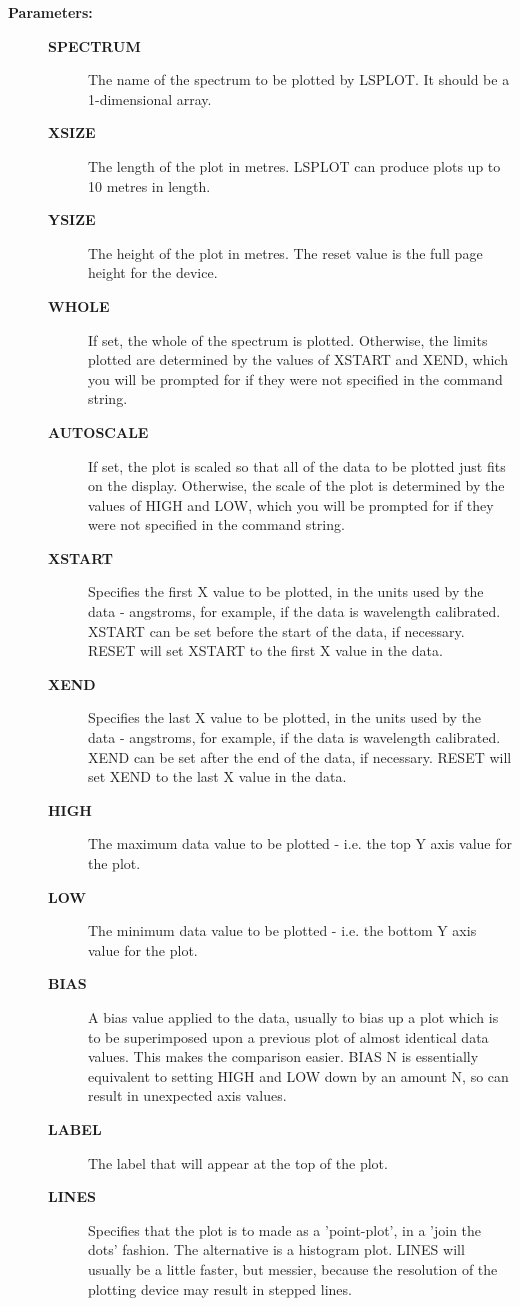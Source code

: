 \begin{description}
\begin{description}
\item [\textbf{Parameters:}]
\begin{description}
\item [\textbf{SPECTRUM}]
 The name of the spectrum to be plotted by LSPLOT.
 It should be a 1-dimensional array.
\item [\textbf{XSIZE}]
 The length of the plot in metres.  LSPLOT
 can produce plots up to 10 metres in length.
\item [\textbf{YSIZE}]
 The height of the plot in metres.  The reset
 value is the full page height for the device.
\item [\textbf{WHOLE}]
 If set, the whole of the spectrum is plotted.
 Otherwise, the limits plotted are determined by the values of
 XSTART and XEND, which you will be prompted for if they were
 not specified in the command string.
\item [\textbf{AUTOSCALE}]
 If set, the plot is scaled so that all of the data to be
 plotted just fits on the display.  Otherwise, the scale
 of the plot is determined by the values of HIGH and LOW,
 which you will be prompted for if they were not specified
 in the command string.
\item [\textbf{XSTART}]
 Specifies the first X value to be plotted, in the
 units used by the data - angstroms, for example, if the data
 is wavelength calibrated.  XSTART can be set before the start
 of the data, if necessary.  RESET will set XSTART to the first
 X value in the data.
\item [\textbf{XEND}]
 Specifies the last X value to be plotted, in the units
 used by the data - angstroms, for example, if the data
 is wavelength calibrated.  XEND can be set after the end
 of the data, if necessary.  RESET will set XEND to the last
 X value in the data.
\item [\textbf{HIGH}]
 The maximum data value to be plotted - i.e. the top
 Y axis value for the plot.
\item [\textbf{LOW}]
 The minimum data value to be plotted - i.e. the bottom
 Y axis value for the plot.
\item [\textbf{BIAS}]
 A bias value applied to the data, usually to bias
 up a plot which is to be superimposed upon a previous plot
 of almost identical data values.  This makes the comparison
 easier.  BIAS N  is essentially equivalent to setting HIGH
 and LOW down by an amount N, so can result in unexpected
 axis values.
\item [\textbf{LABEL}]
 The label that will appear at the top of the plot.
\item [\textbf{LINES}]
 Specifies that the plot is to made as a 'point-plot',
 in a 'join the dots' fashion.  The alternative is a histogram
 plot.  LINES will usually be a little faster, but messier,
 because the resolution of the plotting device may result in
 stepped lines.
\end{description}


\end{description}
\end{description}
